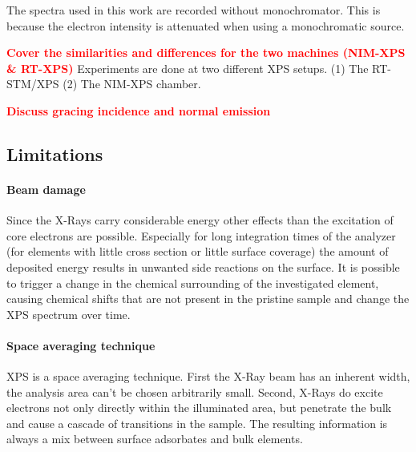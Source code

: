 The spectra used in this work are recorded without monochromator. This is because the electron intensity is attenuated when using a monochromatic source.

\textcolor{red}{\textbf{Cover the similarities and differences for the two machines (NIM-XPS \& RT-XPS)}} Experiments are done at two different XPS setups. (1) The RT-STM/XPS (2) The NIM-XPS chamber. 

\textcolor{red}{\textbf{Discuss gracing incidence and normal emission}}

\subsection{Limitations}
\paragraph{Beam damage}
Since the X-Rays carry considerable energy other effects than the excitation of core electrons are possible. Especially for long integration times of the analyzer (for elements with little cross section or little surface coverage) the amount of deposited energy results in unwanted side reactions on the surface. It is possible to trigger a change in the chemical surrounding of the investigated element, causing chemical shifts that are not present in the pristine sample and change the XPS spectrum over time.

\paragraph{Space averaging technique}
XPS is a space averaging technique. First the X-Ray beam has an inherent width, the analysis area can't be chosen arbitrarily small. Second, X-Rays do excite electrons not only directly within the illuminated area, but penetrate the bulk and cause a cascade of transitions in the sample. The resulting information is always a mix between surface adsorbates and bulk elements.